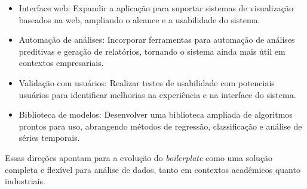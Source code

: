 \begin{itemize}
    \item Interface web: Expandir a aplicação para suportar sistemas de visualização baseados na web, ampliando o alcance e a usabilidade do sistema.
    
    \item Automação de análises: Incorporar ferramentas para automação de análises preditivas e geração de relatórios, tornando o sistema ainda mais útil em contextos empresariais.
    
    \item Validação com usuários: Realizar testes de usabilidade com potenciais usuários para identificar melhorias na experiência e na interface do sistema.
    
    \item Biblioteca de modelos: Desenvolver uma biblioteca ampliada de algoritmos prontos para uso, abrangendo métodos de regressão, classificação e análise de séries temporais.
\end{itemize}

Essas direções apontam para a evolução do \textit{boilerplate} como uma solução completa e flexível para análise de dados, tanto em contextos acadêmicos quanto industriais.

